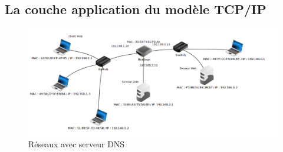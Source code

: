 \documentclass[
  11pt,
]{article}
\begin{document}
\hypertarget{la-couche-application-du-moduxe8le-tcpip}{%
\subsection{La couche application du modèle
TCP/IP}\label{la-couche-application-du-moduxe8le-tcpip}}

\begin{figure}
\centering
\includegraphics[width=1\textwidth,height=\textheight]{images/filius-dns.png}
\caption{Réseaux avec serveur DNS}
\end{figure}
\end{document}
